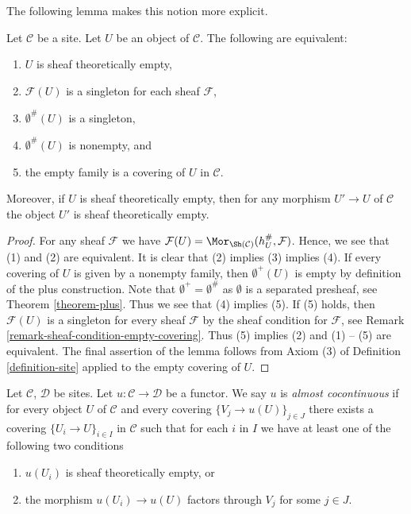 \noindent
The following lemma makes this notion more explicit.

\begin{lemma}
\label{lemma-characterize-empty}
Let $\mathcal{C}$ be a site. Let $U$ be an object of $\mathcal{C}$.
The following are equivalent:
\begin{enumerate}
\item $U$ is sheaf theoretically empty,
\item $\mathcal{F}(U)$ is a singleton for each sheaf $\mathcal{F}$,
\item $\emptyset^\#(U)$ is a singleton,
\item $\emptyset^\#(U)$ is nonempty, and
\item the empty family is a covering of $U$ in $\mathcal{C}$.
\end{enumerate}
Moreover, if $U$ is sheaf theoretically empty, then for any morphism
$U' \to U$ of $\mathcal{C}$ the object $U'$ is sheaf theoretically empty.
\end{lemma}

\begin{proof}
For any sheaf $\mathcal{F}$ we have
$\mathcal{F}(U) = \Mor_{\Sh(\mathcal{C})}(h_U^\#, \mathcal{F})$.
Hence, we see that (1) and (2) are equivalent.
It is clear that (2) implies (3) implies (4).
If every covering of $U$ is given by a nonempty family,
then $\emptyset^+(U)$ is empty by definition of the plus construction.
Note that $\emptyset^+ = \emptyset^\#$ as $\emptyset$ is a separated
presheaf, see
Theorem \ref{theorem-plus}.
Thus we see that (4) implies (5). If (5) holds, then
$\mathcal{F}(U)$ is a singleton for every sheaf $\mathcal{F}$
by the sheaf condition for $\mathcal{F}$, see
Remark \ref{remark-sheaf-condition-empty-covering}.
Thus (5) implies (2) and (1) -- (5) are equivalent. The final
assertion of the lemma follows from Axiom (3) of
Definition \ref{definition-site}
applied to the empty covering of $U$.
\end{proof}

\begin{definition}
\label{definition-almost-cocontinuous}
Let $\mathcal{C}$, $\mathcal{D}$ be sites.
Let $u : \mathcal{C} \to \mathcal{D}$ be a functor.
We say $u$ is {\it almost cocontinuous} if for every
object $U$ of $\mathcal{C}$ and every covering
$\{V_j \to u(U)\}_{j \in J}$ there exists a covering
$\{U_i \to U\}_{i \in I}$ in $\mathcal{C}$ such that
for each $i$ in $I$ we have at least one of the following two conditions
\begin{enumerate}
\item $u(U_i)$ is sheaf theoretically empty, or
\item the morphism $u(U_i) \to u(U)$ factors through $V_j$ for some $j \in J$.
\end{enumerate}
\end{definition}

